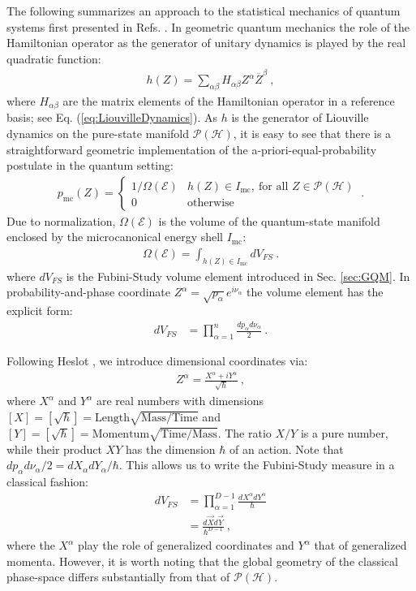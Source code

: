 \documentclass[draft,nofootinbib,pre,twocolumn,showpacs,showkeys,groupaddress,preprintnumbers,floatfix]{revtex4-1}
\newcommand{\1}{\mathbbm{1}}
\begin{document}
The following summarizes an approach to the statistical mechanics of quantum
systems first presented in Refs. \cite{Brody1998,Brody2007,Brody2007b}. In geometric quantum mechanics the role of the Hamiltonian operator as the generator of unitary dynamics is played by the real quadratic function:
\begin{align*}
h(Z) = \sum_{\alpha \beta}H_{\alpha \beta}Z^\alpha \overline{Z}^\beta
  ~,
\end{align*}
where $H_{\alpha \beta}$ are the matrix elements of the Hamiltonian operator in
a reference basis; see Eq. (\ref{eq:LiouvilleDynamics}). As $h$ is the
generator of Liouville dynamics on the pure-state manifold
$\mathcal{P}(\mathcal{H})$, it is easy to see that there is a straightforward
geometric implementation of the a-priori-equal-probability postulate in the
quantum setting:
\begin{align*}
p_{\mathrm{mc}}(Z) = \begin{cases}
	1 / \Omega(\mathcal{E}) &
	h(Z) \in I_{\mathrm{mc}},
	~\text{for~all~} Z \in \mathcal{P}(\mathcal{H}) \\
	0 & \mathrm{otherwise}
	\end{cases}
  ~.
\end{align*}
Due to normalization, $\Omega(\mathcal{E})$ is the volume of the quantum-state manifold enclosed by the microcanonical energy shell $I_{\mathrm{mc}}$:
\begin{align*}
\Omega(\mathcal{E}) = \int_{h(Z)\in I_{\mathrm{mc}}}  dV_{FS}
  ~.
\end{align*}
where $dV_{FS}$ is the Fubini-Study volume element introduced in Sec.
\ref{sec:GQM}. In probability-and-phase coordinate $Z^\alpha =
\sqrt{p_\alpha}e^{i\nu_\alpha}$ the volume element has the explicit form:
\begin{align*}
dV_{FS} & = \prod_{\alpha=1}^n \frac{dp_\alpha d\nu_\alpha}{2}
  ~.
\end{align*}

Following Heslot \cite{Heslot1985}, we introduce dimensional coordinates via:
\begin{align*}
Z^\alpha = \frac{X^\alpha + i Y^\alpha}{\sqrt{\hbar}}
  ~,
\end{align*}
where $X^\alpha$ and $Y^\alpha$ are real numbers with dimensions $\left[ X
\right] = \left[ \sqrt{\hbar}\right] = \mathrm{Length}
\sqrt{\mathrm{Mass}/\mathrm{Time}}$ and $\left[ Y \right] = \left[
\sqrt{\hbar}\right] = \mathrm{Momentum} \sqrt{\mathrm{Time}/\mathrm{Mass}}$.
The ratio $X/Y$ is a pure number, while their product $XY$ has the dimension
$\hbar$ of an action. Note that $dp_\alpha d\nu_\alpha / 2 = dX_\alpha
dY_\alpha / \hbar$. This allows us to write the Fubini-Study measure in a
classical fashion:
\begin{align*}
dV_{FS} & = \prod_{\alpha=1}^{D-1} \frac{dX^\alpha dY^\alpha}{\hbar} \\
  & = \frac{d\vec{X} d\vec{Y}}{\hbar^{D-1}}
  ~,
\end{align*}
where the $X^\alpha$ play the role of generalized coordinates and $Y^\alpha$
that of generalized momenta. However, it is worth noting that the global
geometry of the classical phase-space differs substantially from that of
$\mathcal{P}(\mathcal{H})$. 
\end{document}
